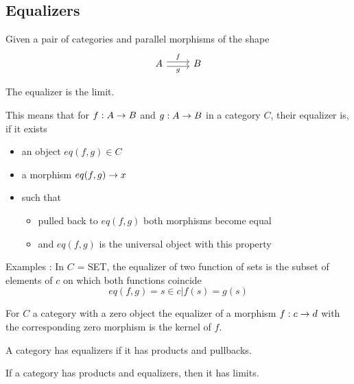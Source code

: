 \documentclass[../../notes.tex]{subfiles}
\begin{document}
\subsection{Equalizers}

\begin{definition}

  Given a pair of categories and parallel morphisms of the shape
  \[
  \begin{tikzcd}
    A \arrow[r, shift left, "f"] \arrow[r, shift right, swap, "g"]& B 
  \end{tikzcd}
\]

The equalizer is the limit. 
  
\end{definition}

This means that for $f : A \rightarrow B$ and $g : A \rightarrow B$ in a category $C$,
their equalizer is, if it exists
\begin{itemize}
\item an object $eq(f,g) \in C$
\item a morphism $eq(f,g) \rightarrow x$
\item such that
  \begin{itemize}
  \item pulled back to $eq(f,g)$ both morphisms become equal
  \item and $eq(f,g)$ is the universal object with this property
  \end{itemize}
\end{itemize}

Examples :
In $C$ = SET, the equalizer of two function of sets is the subset of
elements of $c$ on which both functions coincide
\[ eq(f,g) = {s \in c | f(s) = g(s)} \] 

For $C$ a category with a zero object the equalizer of a morphism
$f : c \rightarrow d$ with the corresponding zero morphism is the kernel of $f$.

\begin{prop}

  A category has equalizers if it has products and pullbacks.
  
\end{prop}

\begin{prop}

  If a category has products and equalizers, then it has limits.
  
\end{prop}
\end{document}
